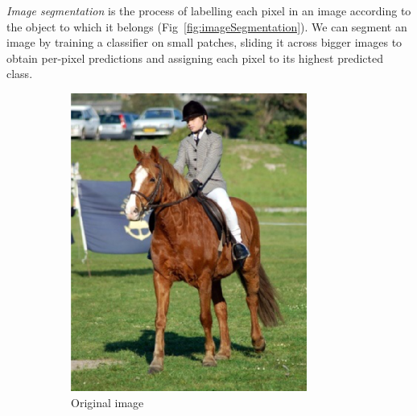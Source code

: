 \emph{Image segmentation} is the process of labelling each pixel in an image according to the object to which it belongs (Fig~\ref{fig:imageSegmentation}).
We can segment an image by training a classifier on small patches, sliding it across bigger images to obtain per-pixel predictions and assigning each pixel to its highest predicted class.

\begin{figure}[h]
	\centering
	\begin{subfigure}{0.27\textwidth}
                \includegraphics[width=\textwidth]{plots/segmentationImage.png}
		\caption{Original image}
        \end{subfigure}
	~
	\begin{subfigure}{0.27\textwidth}

\end{subfigure}
\end{figure}
